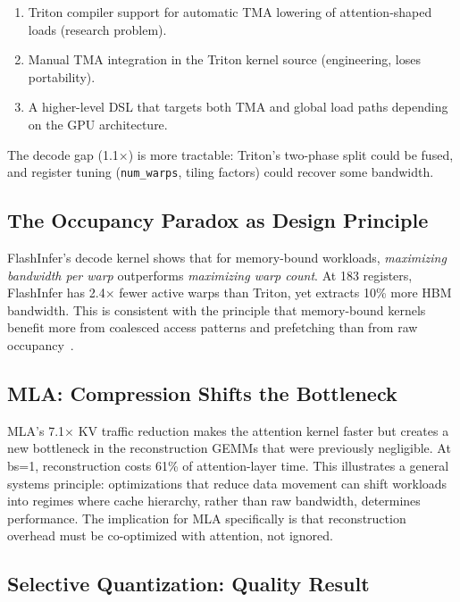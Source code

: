 \documentclass[10pt,twocolumn]{article}
\begin{document}
\begin{enumerate}[leftmargin=*,topsep=0pt]
  \item Triton compiler support for automatic TMA lowering of attention-shaped loads (research problem).
  \item Manual TMA integration in the Triton kernel source (engineering, loses portability).
  \item A higher-level DSL that targets both TMA and global load paths depending on the GPU architecture.
\end{enumerate}

The decode gap (1.1$\times$) is more tractable: Triton's two-phase split could be fused, and register tuning (\texttt{num\_warps}, tiling factors) could recover some bandwidth.

\subsection{The Occupancy Paradox as Design Principle}

FlashInfer's decode kernel shows that for memory-bound workloads, \emph{maximizing bandwidth per warp} outperforms \emph{maximizing warp count}.  At 183 registers, FlashInfer has 2.4$\times$ fewer active warps than Triton, yet extracts 10\% more HBM bandwidth.  This is consistent with the principle that memory-bound kernels benefit more from coalesced access patterns and prefetching than from raw occupancy~\cite{volkov2010}.

\subsection{MLA: Compression Shifts the Bottleneck}

MLA's 7.1$\times$ KV traffic reduction makes the attention kernel faster but creates a new bottleneck in the reconstruction GEMMs that were previously negligible.  At bs=1, reconstruction costs 61\% of attention-layer time.  This illustrates a general systems principle: optimizations that reduce data movement can shift workloads into regimes where cache hierarchy, rather than raw bandwidth, determines performance.  The implication for MLA specifically is that reconstruction overhead must be co-optimized with attention, not ignored.

\subsection{Selective Quantization: Quality Result}
\end{document}
